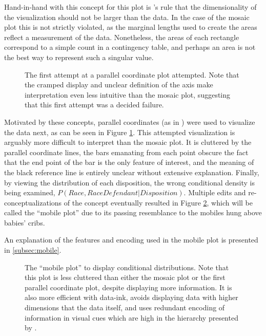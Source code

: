Hand-in-hand with this concept for this plot is \citeauthor{VisualDisplayQuant}'s rule that the dimensionality of the
visualization should not be larger than the data. In the case of the mosaic plot this is not strictly violated, as the marginal
lengths used to create the areas reflect a measurement of the data. Nonetheless, the areas of each rectangle correspond to a
simple count in a contingency table, and perhaps an area is not the best way to represent such a singular value.

\begin{figure}[!h]
  \centering
  \caption[First Parallel Coordinate Attempt]{The first attempt at a parallel coordinate plot attempted. Note that the cramped
    display and unclear definition of the axis make interpretation even less intuitive than the mosaic plot, suggesting that this
    first attempt was a decided failure.}
  \label{fig:firstparcoord}
\end{figure}

Motivated by these concepts, parallel coordinates (as in \cite{wegman1990}) were used to visualize the data next, as can be seen
in Figure \ref{fig:firstparcoord}. This attempted visualization is arguably more difficult to interpret than the mosaic plot. It
is cluttered by the parallel coordinate lines, the bars emanating from each point obscure the fact that the end point of the bar
is the only feature of interest, and the meaning of the black reference line is entirely unclear without extensive
explanation. Finally, by viewing the distribution of each disposition, the wrong conditional density is being examined,
$P(Race,Race Defendant|Disposition)$. Multiple edits and re-conceptualizations of the concept eventually resulted in Figure
\ref{fig:raceparcoord}, which will be called the ``mobile plot'' due to its passing resemblance to the mobiles hung above babies'
cribs.

An explanation of the features and encoding used in the mobile plot is presented in \ref{subsec:mobile}.

\begin{figure}[!h]
  \centering
  \caption[The ``Mobile Plot'']{The ``mobile plot'' to display conditional distributions. Note that this plot is less cluttered
    than either the mosaic plot or the first parallel coordinate plot, despite displaying more information. It is also more
    efficient with data-ink, avoids displaying data with higher dimensions that the data itself, and uses redundant encoding of
    information in visual cues which are high in the hierarchy presented by \cite{cleveland1987}.}
  \label{fig:raceparcoord}
\end{figure}

